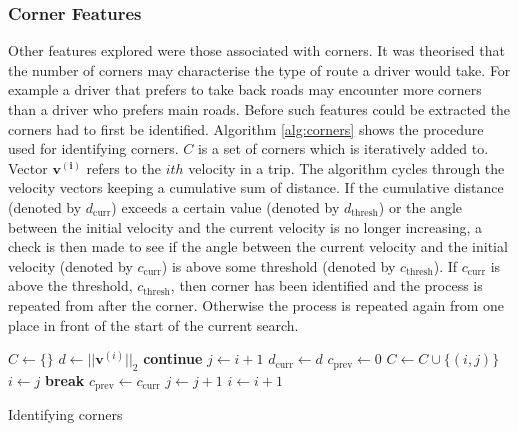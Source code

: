 \documentclass[a4paper, 11pt, twocolumn]{report}
\begin{document}
\subsubsection{Corner Features}
Other features explored were those associated with corners.
It was theorised that the number of corners may characterise the type of route a driver would take. For example a driver that prefers to take back roads may encounter more corners than a driver who prefers main roads.
Before such features could be extracted the corners had to first be identified.
Algorithm \ref{alg:corners} shows the procedure used for identifying corners.
$C$ is a set of corners which is iteratively added to.
Vector $\mathbf{v^{(i)}}$ refers to the $ith$ velocity in a trip.
The algorithm cycles through the velocity vectors keeping a cumulative sum of distance.
If the cumulative distance (denoted by $d_\text{curr}$) exceeds a certain value (denoted by $d_\text{thresh}$) or the angle between the initial velocity and the current velocity is no longer increasing, a check is then made to see if the angle between the current velocity and the initial velocity (denoted by $c_\text{curr}$) is above some threshold (denoted by $c_\text{thresh}$).
If $c_\text{curr}$ is above the threshold, $c_\text{thresh}$, then corner has been identified and the process is repeated from after the corner.
Otherwise the process is repeated again from one place in front of the start of the current search.


\begin{algorithm}
\begin{algorithmic}
    \State $C \gets \{\}$
        \State $d \gets ||\mathbf{v}^{(i)}||_2$
            \State \textbf{continue}
        \EndIf
        \State $j \gets i + 1$
        \State $d_{\text{curr}} \gets d$    
        \State $c_{\text{prev}} \gets 0$ 
        \Loop
                    \State $C \gets C \cup \{(i, j)\}$
                    \State $i \gets j$
                \EndIf
                \State \textbf{break}
            \EndIf
            \State $c_{\text{prev}} \gets c_{\text{curr}}$ 
            \State $j \gets j+1$
        \EndLoop
        \State $i \gets i+1$
    \EndWhile
\end{algorithmic}
\caption{Identifying corners}
\label{alg:corners}
\end{algorithm}
\end{document}
